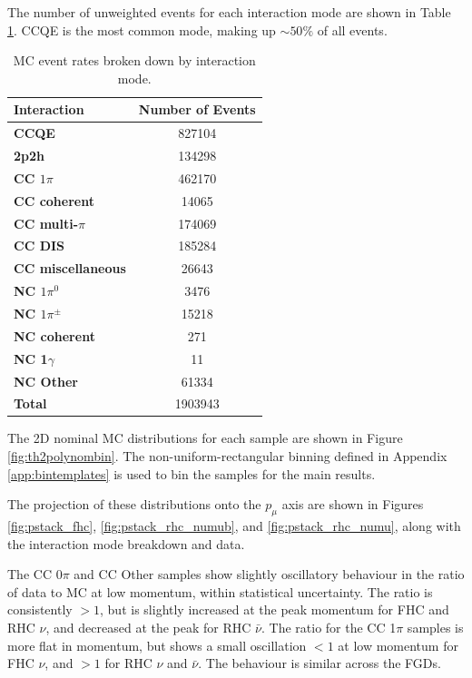 The number of unweighted events for each interaction mode are shown in Table \ref{tab:modes}. CCQE is the most common mode, making up $\sim50\%$ of all events.

\begin{center}
\begin{table}[!htbp]
\center
\begin{tabular}{l||c}
\hline \hline
\textbf{Interaction} & \textbf{Number of Events}\\
\hline
\hline
\textbf{CCQE} & 827104 \\
\textbf{2p2h} & 134298 \\
\textbf{CC $1\pi$} & 462170 \\
\textbf{CC coherent} & 14065 \\
\textbf{CC multi-$\pi$} & 174069 \\
\textbf{CC DIS} & 185284 \\
\textbf{CC miscellaneous} & 26643 \\
\textbf{NC $1\pi^0$} & 3476 \\
\textbf{NC $1\pi^{\pm}$} & 15218 \\
\textbf{NC coherent} & 271 \\
\textbf{NC 1$\gamma$} & 11 \\
\textbf{NC Other} & 61334 \\ \hline
\textbf{Total} & 1903943\\ \hline\hline
\end{tabular}
\caption{MC event rates broken down by interaction mode.}
\label{tab:modes}
\end{table}
\end{center}
\vspace{-1cm}

The 2D nominal MC distributions for each sample are shown in Figure \ref{fig:th2polynombin}. The non-uniform-rectangular binning defined in Appendix \ref{app:bintemplates} is used to bin the samples for the main results. 

The projection of these distributions onto the $p_{\mu}$ axis are shown in Figures \ref{fig:pstack_fhc}, \ref{fig:pstack_rhc_numub}, and \ref{fig:pstack_rhc_numu}, along with the interaction mode breakdown and data.

The CC 0$\pi$ and CC Other samples show slightly oscillatory behaviour in the ratio of data to MC at low momentum, within statistical uncertainty. The ratio is consistently $>1$, but is slightly increased at the peak momentum for FHC and RHC $\nu$, and decreased at the peak for RHC $\bar{\nu}$. The ratio for the CC 1$\pi$ samples is more flat in momentum, but shows a small oscillation $<1$ at low momentum for FHC $\nu$, and $>1$ for RHC $\nu$ and $\bar{\nu}$. The behaviour is similar across the FGDs.

